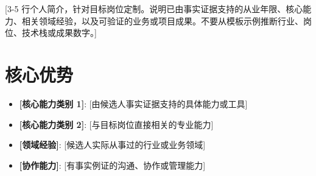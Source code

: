 \documentclass[11pt,a4paper,sans]{moderncv}
\begin{document}
\makecvtitle


\vspace{6pt}
\small{[3-5 行个人简介，针对目标岗位定制。说明已由事实证据支持的从业年限、核心能力、相关领域经验，以及可验证的业务或项目成果。不要从模板示例推断行业、岗位、技术栈或成果数字。]}


\section{核心优势}
\vspace{1pt}
\begin{itemize}
\item \textbf{[核心能力类别 1]}: [由候选人事实证据支持的具体能力或工具]
\item \textbf{[核心能力类别 2]}: [与目标岗位直接相关的专业能力]
\item \textbf{[领域经验]}: [候选人实际从事过的行业或业务领域]
\item \textbf{[协作能力]}: [有事实例证的沟通、协作或管理能力]
\end{itemize}

\end{document}
